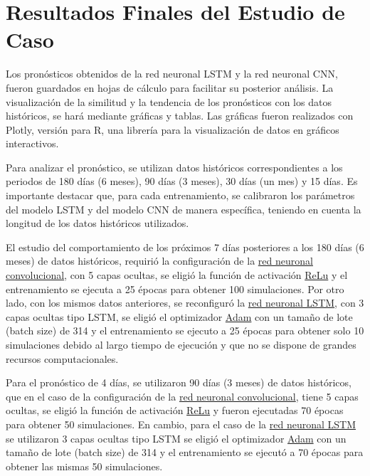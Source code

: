 \documentclass[
  us-letterpaper,
]{scrreprt}
\theoremstyle{plain}
\theoremstyle{definition}
\theoremstyle{definition}
\theoremstyle{remark}
\begin{document}
\newpage

\section{Resultados Finales del Estudio de
Caso}\label{resultados-finales-del-estudio-de-caso}

Los pronósticos obtenidos de la red neuronal LSTM y la red neuronal CNN,
fueron guardados en hojas de cálculo para facilitar su posterior
análisis. La visualización de la similitud y la tendencia de los
pronósticos con los datos históricos, se hará mediante gráficas y
tablas. Las gráficas fueron realizados con Plotly, versión para R, una
librería para la visualización de datos en gráficos interactivos.

Para analizar el pronóstico, se utilizan datos históricos
correspondientes a los periodos de 180 días (6 meses), 90 días (3
meses), 30 días (un mes) y 15 días. Es importante destacar que, para
cada entrenamiento, se calibraron los parámetros del modelo LSTM y del
modelo CNN de manera específica, teniendo en cuenta la longitud de los
datos históricos utilizados.

El estudio del comportamiento de los próximos 7 días posteriores a los
180 días (6 meses) de datos históricos, requirió la configuración de la
\hyperref[sec-implementaciuxf3n-de-la-red-neuronal-cnn]{red neuronal
convolucional}, con 5 capas ocultas, se eligió la función de activación
\hyperref[sec-Relu]{ReLu} y el entrenamiento se ejecuta a 25 épocas para
obtener 100 simulaciones. Por otro lado, con los mismos datos
anteriores, se reconfiguró la
\hyperref[sec-implementaciuxf3n-de-la-red-neuronal-lstm]{red neuronal
LSTM}, con 3 capas ocultas tipo LSTM, se eligió el optimizador
\hyperref[sec-Adam]{Adam} con un tamaño de lote (batch size) de 314 y el
entrenamiento se ejecuto a 25 épocas para obtener solo 10 simulaciones
debido al largo tiempo de ejecución y que no se dispone de grandes
recursos computacionales.

Para el pronóstico de 4 días, se utilizaron 90 días (3 meses) de datos
históricos, que en el caso de la configuración de la
\hyperref[sec-implementaciuxf3n-de-la-red-neuronal-cnn]{red neuronal
convolucional}, tiene 5 capas ocultas, se eligió la función de
activación \hyperref[sec-Relu]{ReLu} y fueron ejecutadas 70 épocas para
obtener 50 simulaciones. En cambio, para el caso de la
\hyperref[sec-implementaciuxf3n-de-la-red-neuronal-lstm]{red neuronal
LSTM} se utilizaron 3 capas ocultas tipo LSTM se eligió el optimizador
\hyperref[sec-Adam]{Adam} con un tamaño de lote (batch size) de 314 y el
entrenamiento se ejecutó a 70 épocas para obtener las mismas 50
simulaciones.
\end{document}
